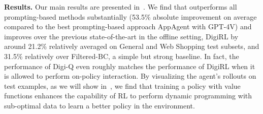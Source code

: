\textbf{Results.} Our main results are presented in~. We find that \ourmethod{} outperforms all prompting-based methods substantially (53.5\% absolute improvement on average compared to the best prompting-based approach AppAgent with GPT-4V) and improves over the previous state-of-the-art in the offline setting, DigiRL by around 21.2\% relatively averaged on General and Web Shopping test subsets, and 31.5\% relatively over Filtered-BC, a simple but strong baseline. In fact, the performance of Digi-Q even roughly matches the performance of DigiRL when it is allowed to perform on-policy interaction. By visualizing the agent's rollouts on test examples, as we will show in~, we find that training a policy with value functions enhances the capability of RL to perform dynamic programming with sub-optimal data to learn a better policy in the environment. 

